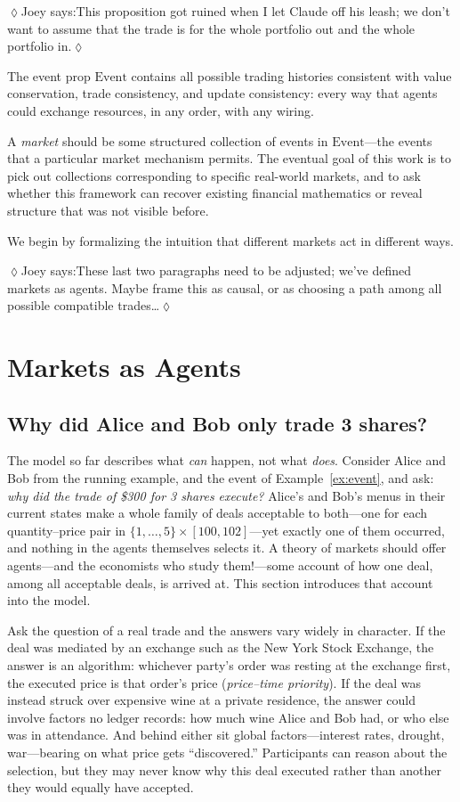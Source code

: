 \documentclass[11pt, one side, article]{memoir}
\theoremstyle{definition}
\theoremstyle{plain}
\newcommand{\0}{\textsf{0}}
\newcommand{\1}{\tn{\textsf{1}}}
\newcommand{\Event}{\mathrm{Event}}
\newcommand{\jnote}[1]{{\color{teal}\quad$\lozenge$\quad Joey says:\quad #1\quad$\lozenge$\quad}}
\begin{document}
\jnote{This proposition got ruined when I let Claude off his leash; we don't want to assume that the trade is for the whole portfolio out and the whole portfolio in.}

The event prop $\Event$ contains all possible trading histories consistent with value conservation, trade consistency, and update consistency: every way that agents could exchange resources, in any order, with any wiring.

A \emph{market} should be some structured collection of events in $\Event$---the events that a particular market mechanism permits.  The eventual goal of this work is to pick out collections corresponding to specific real-world markets, and to ask whether this framework can recover existing financial mathematics or reveal structure that was not visible before.

We begin by formalizing the intuition that different markets act in different ways.

\jnote{These last two paragraphs need to be adjusted; we've defined markets as agents. Maybe frame this as causal, or as choosing a path among all possible compatible trades\ldots}

\section*{Markets as Agents}

\subsection*{Why did Alice and Bob only trade 3 shares?}

The model so far describes what \emph{can} happen, not what \emph{does}.
Consider Alice and Bob from the running example, and the event of
Example~\ref{ex:event}, and ask: \emph{why did the trade of \$300 for
3 shares execute?}  Alice's and Bob's menus in their current states
make a whole family of deals acceptable to both---one for each
quantity--price pair in $\{1,\ldots,5\}\times[100,102]$---yet exactly
one of them occurred, and nothing in the agents themselves selects it.
A theory of markets should offer agents---and the economists who
study them!---some account of how one deal, among all acceptable
deals, is arrived at. This section introduces that
account into the model.

Ask the question of a real trade and the answers vary widely in
character.  If the deal was mediated by an exchange such as the New
York Stock Exchange, the answer is an algorithm: whichever party's
order was resting at the exchange first, the executed price is that
order's price (\emph{price--time priority}).  If the deal was instead struck over 
expensive wine at a private residence, the answer could involve factors no ledger records: 
how much wine Alice and Bob had, or who else was in attendance.
And behind either sit global factors---interest rates, drought,
war---bearing on what price gets ``discovered.''  Participants can
reason about the selection, but they may never know why this deal
executed rather than another they would equally have accepted.
\end{document}
